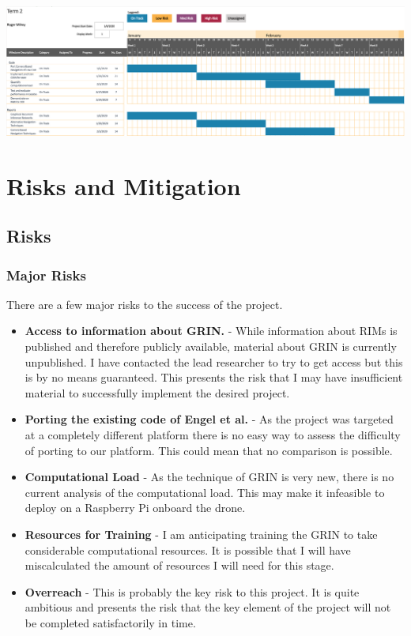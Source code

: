\documentclass[]{final_report}
\begin{document}
\vspace{20pt}

\includegraphics[width=\textwidth]{Term2GanttChart.png}


\chapter{Risks and Mitigation}

\section{Risks}
\subsection{Major Risks}

There are a few major risks to the success of the project.

\begin{itemize}
  \item \textbf{Access to information about GRIN.} - While information about RIMs is published and therefore publicly available, material about GRIN is currently unpublished. I have contacted the lead researcher to try to get access but this is by no means guaranteed. This presents the risk that I may have insufficient material to successfully implement the desired project.
  \item \textbf{Porting the existing code of Engel et al.} - As the project was targeted at a completely different platform there is no easy way to assess the difficulty of porting to our platform. This could mean that no comparison is possible.
  \item \textbf{Computational Load} - As the technique of GRIN is very new, there is no current analysis of the computational load. This may make it infeasible to deploy on a Raspberry Pi onboard the drone.
  \item \textbf{Resources for Training} - I am anticipating training the GRIN to take considerable computational resources. It is possible that I will have miscalculated the amount of resources I will need for this stage.
  \item \textbf{Overreach} - This is probably the key risk to this project. It is quite ambitious and presents the risk that the key element of the project will not be completed satisfactorily in time.
\end{itemize}
\end{document}

